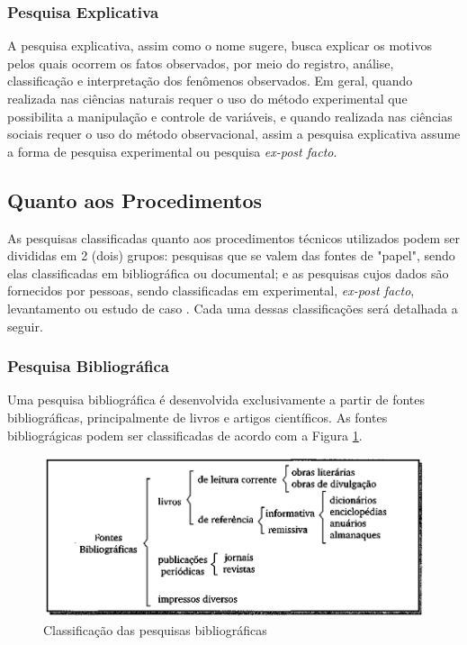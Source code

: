 \subsubsection{Pesquisa Explicativa}
A pesquisa explicativa, assim como o nome sugere, busca explicar os motivos pelos quais ocorrem os fatos observados, por meio do registro, análise, classificação e interpretação dos fenômenos observados. 
Em geral, quando realizada nas ciências naturais requer o uso do método experimental que possibilita a manipulação e controle de variáveis, e quando realizada nas ciências sociais requer o uso do método observacional, assim a pesquisa explicativa assume a forma de pesquisa experimental ou pesquisa \textit{ex-post facto}. \cite{prodanov2013metodologia}

\subsection{Quanto aos Procedimentos}
As pesquisas classificadas quanto aos procedimentos técnicos utilizados podem ser divididas em 2 (dois) grupos: pesquisas que se valem das fontes de "papel", sendo elas classificadas em bibliográfica ou documental; e as pesquisas cujos dados são fornecidos por pessoas, sendo classificadas em experimental, \textit{ex-post facto}, levantamento ou estudo de caso \cite{ac2002elaborar}. Cada uma dessas classificações será detalhada a seguir.

\subsubsection{Pesquisa Bibliográfica} 
Uma pesquisa bibliográfica é desenvolvida exclusivamente a partir de fontes bibliográficas, principalmente de livros e artigos científicos. As fontes bibliográgicas podem ser classificadas de acordo com a Figura \ref{tiposDePesquisaBibliografica}.

\begin{figure}[h]
\centering
\includegraphics[keepaspectratio=true,scale=0.3]{figuras/tiposDePesquisaBibliografica.png}
\caption{Classificação das pesquisas bibliográficas}
\label{tiposDePesquisaBibliografica}
\end{figure}
	
